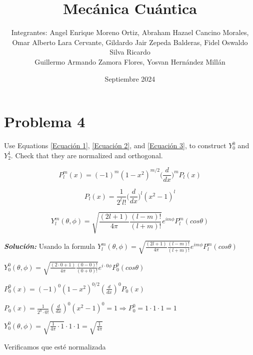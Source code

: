 \documentclass[10pt]{article}
\title{\LARGE{Mecánica Cuántica}}
\author{%
    Integrantes: Angel Enrique Moreno Ortiz,
    Abraham Hazael Cancino Morales, \\
    Omar Alberto Lara Cervante,
    Gildardo Jair Zepeda Balderas, Fidel Oswaldo Silva Ricardo \\
    Guillermo Armando Zamora Flores, 
    Yosvan Hernández Millán}
\date{Septiembre 2024}
\begin{document}
\maketitle


\section{Problema 4}

\medskip
\begin{tcolorbox}[colback=gray!10, colframe=black, title=Problem 4]

Use Equations \ref{Ecuación 1}, \ref{Ecuación 2}, and \ref{Ecuación 3}, to construct $Y_{0}^{0}$ and $Y_{2}^{1}$. Check
that they are normalized and orthogonal.

\begin{equation}
    P_{l}^{m}(x)=(-1)^{m}(1-x^{2})^{m/2}\bigg(\frac{d}{dx}\bigg)^{m}P_{l}(x)
    \label{Ecuación 1}
\end{equation}

\begin{equation}
    P_{l}(x)=\frac{1}{2^{l}l!}\bigg(\frac{d}{dx} \bigg)^{l}(x^{2}-1)^{l}
    \label{Ecuación 2}
\end{equation}

\begin{equation}
    Y_{l}^{m}(\theta,\phi)=\sqrt{\frac{(2l+1)}{4\pi}\frac{(l-m)!}{(l+m)!}}e^{im\phi}P_{l}^{m}(cos\theta)
    \label{Ecuación 3}
\end{equation}


\end{tcolorbox}
\medskip

\Large{\textit{\textbf{Solución:}}}
Usando la formula $Y_l^m(\theta,\phi)=\sqrt{\frac{(2l+1)}{4\pi}\frac{(l-m)!}{(l+m)!}}e^{im\phi}P_l^m(cos\theta)$


\begin{center}
    $Y_0^0(\theta,\phi)= \sqrt{\frac{(2\cdot 0+1)}{4\pi}\frac{(0-0)!}{(0+0)!}}e^{i\cdot 0\phi}P_0^0(cos\theta)$

    $P_0^0(x)=(-1)^0(1-x^2)^{0/2}(\frac{d}{dx})^0P_0(x)$

    $P_0(x)=\frac{1}{2^0\cdot 0!}(\frac{d}{dx})^0(x^2-1)^0=1 \Rightarrow P_0^0=1\cdot 1\cdot 1=1$

    $Y_0^0(\theta,\phi)=\sqrt{\frac{1}{4\pi}\cdot 1}\cdot1\cdot1=\sqrt{\frac{1}{4\pi}}$

\end{center}

Verificamos que esté normalizada
\end{document}
